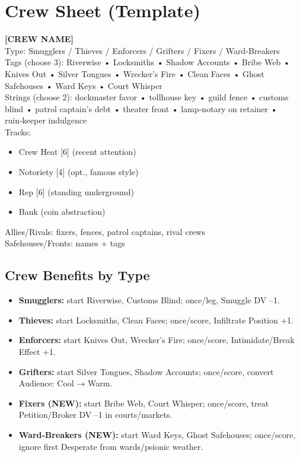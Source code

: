 \documentclass[11pt]{article}
\begin{document}
\section{Crew Sheet (Template)}
\begin{framed}
\noindent \textbf{[CREW NAME]} \\
Type: Smugglers / Thieves / Enforcers / Grifters / Fixers / Ward‑Breakers \\
Tags (choose 3): Riverwise • Locksmiths • Shadow Accounts • Bribe Web • Knives Out • Silver Tongues • Wrecker's Fire • Clean Faces • Ghost Safehouses • Ward Keys • Court Whisper \\
Strings (choose 2): dockmaster favor • tollhouse key • guild fence • customs blind • patrol captain's debt • theater front • lamp‑notary on retainer • ruin‑keeper indulgence \\
Tracks:
\begin{itemize}
\item Crew Heat [6] (recent attention)
\item Notoriety [4] (opt., famous style)
\item Rep [6] (standing underground)
\item Bank (coin abstraction)
\end{itemize}
Allies/Rivals: fixers, fences, patrol captains, rival crews \\
Safehouses/Fronts: names + tags
\end{framed}

\subsection*{Crew Benefits by Type}
\begin{itemize}
\item \textbf{Smugglers:} start Riverwise, Customs Blind; once/leg, Smuggle DV --1.
\item \textbf{Thieves:} start Locksmiths, Clean Faces; once/score, Infiltrate Position +1.
\item \textbf{Enforcers:} start Knives Out, Wrecker's Fire; once/score, Intimidate/Break Effect +1.
\item \textbf{Grifters:} start Silver Tongues, Shadow Accounts; once/score, convert Audience: Cool → Warm.
\item \textbf{Fixers (NEW):} start Bribe Web, Court Whisper; once/score, treat Petition/Broker DV --1 in courts/markets.
\item \textbf{Ward‑Breakers (NEW):} start Ward Keys, Ghost Safehouses; once/score, ignore first Desperate from wards/psionic weather.
\end{itemize}
\end{document}

